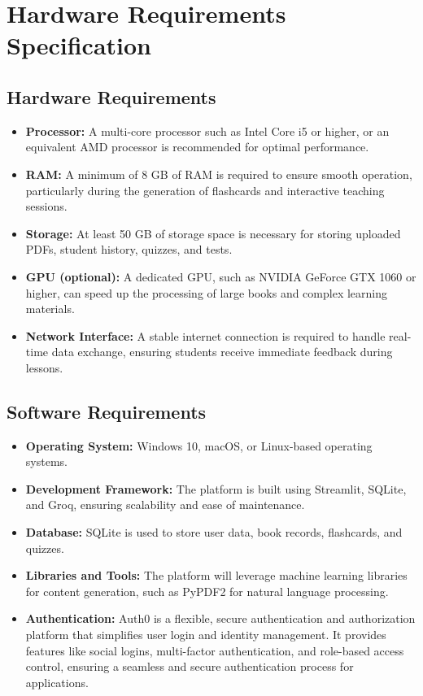 \documentclass{report}
\begin{document}
\section{Hardware Requirements Specification}

\subsection{Hardware Requirements}
\begin{itemize}
    \item \textbf{Processor:} A multi-core processor such as Intel Core i5 or higher, or an equivalent AMD processor is recommended for optimal performance.
    \item \textbf{RAM:} A minimum of 8 GB of RAM is required to ensure smooth operation, particularly during the generation of flashcards and interactive teaching sessions.
    \item \textbf{Storage:} At least 50 GB of storage space is necessary for storing uploaded PDFs, student history, quizzes, and tests.
    \item \textbf{GPU (optional):} A dedicated GPU, such as NVIDIA GeForce GTX 1060 or higher, can speed up the processing of large books and complex learning materials.
    \item \textbf{Network Interface:} A stable internet connection is required to handle real-time data exchange, ensuring students receive immediate feedback during lessons.
\end{itemize}

\subsection{Software Requirements}
\begin{itemize}
    \item \textbf{Operating System:} Windows 10, macOS, or Linux-based operating systems.
    \item \textbf{Development Framework:} The platform is built using Streamlit, SQLite, and Groq, ensuring scalability and ease of maintenance.
    \item \textbf{Database:} SQLite is used to store user data, book records, flashcards, and quizzes.
    \item \textbf{Libraries and Tools:} The platform will leverage machine learning libraries for content generation, such as PyPDF2 for natural language processing.
    \item \textbf{Authentication:} Auth0 is a flexible, secure authentication and authorization platform that simplifies user login and identity management. It provides features like social logins, multi-factor authentication, and role-based access control, ensuring a seamless and secure authentication process for applications.
\end{itemize}
\end{document}
